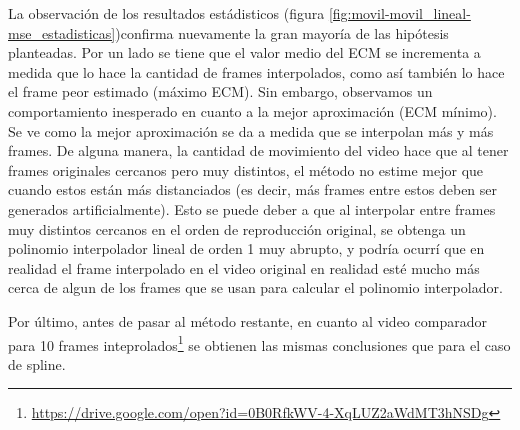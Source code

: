 \par La observaci\'on de los resultados est\'adisticos (figura
\ref{fig:movil-movil_lineal-mse_estadisticas})confirma nuevamente la gran
mayor\'ia de las hip\'otesis planteadas. Por un lado se tiene que el valor
medio del ECM se incrementa a medida que lo hace la cantidad de frames
interpolados, como as\'i tambi\'en lo hace el frame peor estimado (m\'aximo
ECM). Sin embargo, observamos un comportamiento inesperado en cuanto a la mejor
aproximaci\'on (ECM m\'inimo). Se ve como la mejor aproximaci\'on se da a medida
que se interpolan m\'as y m\'as frames. De alguna manera, la cantidad de
movimiento del video hace que al tener frames originales cercanos pero muy
distintos, el m\'etodo no estime mejor que cuando estos est\'an m\'as
distanciados (es decir, m\'as frames entre estos deben ser generados
artificialmente). Esto se puede deber a que al interpolar entre frames muy
distintos cercanos en el orden de reproducci\'on original, se obtenga un
polinomio interpolador lineal de orden 1 muy abrupto, y podr\'ia ocurr\'i que
en realidad el frame interpolado en el video original en realidad est\'e mucho
m\'as cerca de algun de los frames que se usan para calcular el polinomio
interpolador.



\par Por \'ultimo, antes de pasar al m\'etodo restante, en cuanto al video
comparador para 10 frames
inteprolados\footnote{\url{https://drive.google.com/open?id=0B0RfkWV-4-XqLUZ2aWdMT3hNSDg}}
se obtienen las mismas conclusiones que para el caso de spline.

